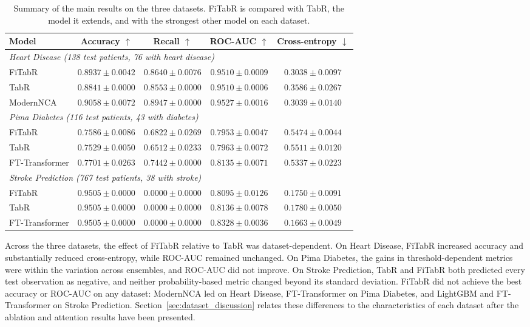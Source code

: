 \documentclass[11pt,a4paper,oneside, openany, reqno, chapter, nokorean]{oblivoir}
\theoremstyle{definition}
\theoremstyle{remark}
\numberwithin{equation}{chapter}
\theoremstyle{definition}
\theoremstyle{remark}
\theoremstyle{definition}
\begin{document}
\begin{table}[!htbp]
\centering
\caption[Summary of the main results on the three datasets.]{Summary of
the main results on the three datasets. FiTabR is compared with TabR, the
model it extends, and with the strongest other model on each dataset.}
\label{tab:summary_results}
\small
\setlength{\tabcolsep}{4pt}
\begin{tabular}{lcccc}
\toprule
Model & Accuracy $\uparrow$ & Recall $\uparrow$ & ROC-AUC $\uparrow$ & Cross-entropy $\downarrow$ \\
\midrule
\multicolumn{5}{l}{\textit{Heart Disease (138 test patients, 76 with heart disease)}} \\
FiTabR    & $0.8937 \pm 0.0042$ & $0.8640 \pm 0.0076$ & $0.9510 \pm 0.0009$ & $0.3038 \pm 0.0097$ \\
TabR      & $0.8841 \pm 0.0000$ & $0.8553 \pm 0.0000$ & $0.9510 \pm 0.0006$ & $0.3586 \pm 0.0267$ \\
ModernNCA & $0.9058 \pm 0.0072$ & $0.8947 \pm 0.0000$ & $0.9527 \pm 0.0016$ & $0.3039 \pm 0.0140$ \\
\midrule
\multicolumn{5}{l}{\textit{Pima Diabetes (116 test patients, 43 with diabetes)}} \\
FiTabR         & $0.7586 \pm 0.0086$ & $0.6822 \pm 0.0269$ & $0.7953 \pm 0.0047$ & $0.5474 \pm 0.0044$ \\
TabR           & $0.7529 \pm 0.0050$ & $0.6512 \pm 0.0233$ & $0.7963 \pm 0.0072$ & $0.5511 \pm 0.0120$ \\
FT-Transformer & $0.7701 \pm 0.0263$ & $0.7442 \pm 0.0000$ & $0.8135 \pm 0.0071$ & $0.5337 \pm 0.0223$ \\
\midrule
\multicolumn{5}{l}{\textit{Stroke Prediction (767 test patients, 38 with stroke)}} \\
FiTabR         & $0.9505 \pm 0.0000$ & $0.0000 \pm 0.0000$ & $0.8095 \pm 0.0126$ & $0.1750 \pm 0.0091$ \\
TabR           & $0.9505 \pm 0.0000$ & $0.0000 \pm 0.0000$ & $0.8136 \pm 0.0078$ & $0.1780 \pm 0.0050$ \\
FT-Transformer & $0.9505 \pm 0.0000$ & $0.0000 \pm 0.0000$ & $0.8328 \pm 0.0036$ & $0.1663 \pm 0.0049$ \\
\bottomrule
\end{tabular}
\end{table}

Across the three datasets, the effect of FiTabR relative to TabR was
dataset-dependent. On Heart Disease, FiTabR increased accuracy and
substantially reduced cross-entropy, while ROC-AUC remained unchanged. On Pima
Diabetes, the gains in threshold-dependent metrics were within the variation
across ensembles, and ROC-AUC did not improve. On Stroke Prediction, TabR and
FiTabR both predicted every test observation as negative, and neither
probability-based metric changed beyond its standard deviation. FiTabR did not
achieve the best accuracy or ROC-AUC on any dataset: ModernNCA led on Heart
Disease, FT-Transformer on Pima Diabetes, and LightGBM and FT-Transformer on
Stroke Prediction. Section~\ref{sec:dataset_discussion} relates these
differences to the characteristics of each dataset after the ablation and
attention results have been presented.
\end{document}
